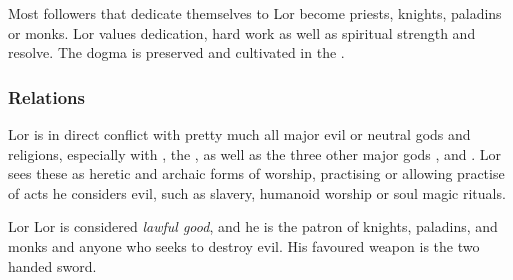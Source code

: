 Most followers that dedicate themselves to Lor become priests, knights,
paladins or monks. Lor values dedication, hard work as well as spiritual
strength and resolve. The dogma is preserved and cultivated in the
.

\subsubsection{Relations}

Lor is in direct conflict with pretty much all major evil or neutral gods and
religions, especially with , the ,
as well as the three other major gods , 
and . Lor sees these as heretic and archaic forms of
worship, practising or allowing practise of acts he considers evil, such as
slavery, humanoid worship or soul magic rituals.

\begin{35e}{Lor}
  Lor is considered \emph{lawful good}, and he is the patron of knights,
  paladins, and monks and anyone who seeks to destroy evil. His favoured
  weapon is the two handed sword.
\end{35e}
